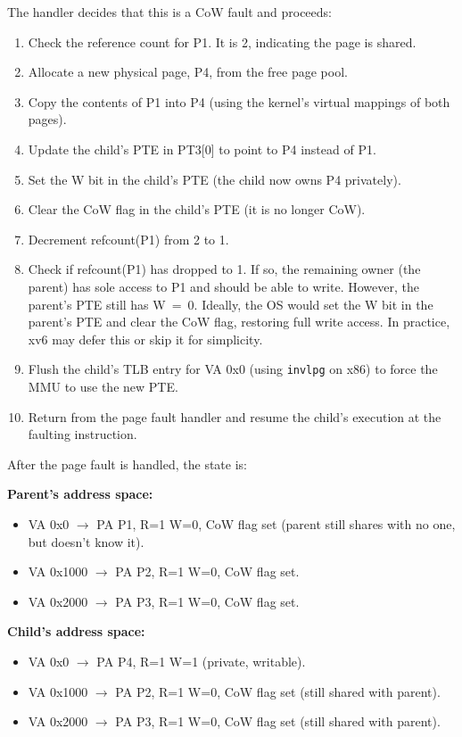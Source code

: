 \documentclass[11pt]{article}
\begin{document}
The handler decides that this is a CoW fault and proceeds:

\begin{enumerate}
    \item Check the reference count for P1. It is 2, indicating the page is shared.
    \item Allocate a new physical page, P4, from the free page pool.
    \item Copy the contents of P1 into P4 (using the kernel's virtual mappings of both pages).
    \item Update the child's PTE in PT3[0] to point to P4 instead of P1.
    \item Set the W bit in the child's PTE (the child now owns P4 privately).
    \item Clear the CoW flag in the child's PTE (it is no longer CoW).
    \item Decrement refcount(P1) from 2 to 1.
    \item Check if refcount(P1) has dropped to 1. If so, the remaining owner (the parent) has sole access to P1 and should be able to write. However, the parent's PTE still has W~=~0. Ideally, the OS would set the W bit in the parent's PTE and clear the CoW flag, restoring full write access. In practice, xv6 may defer this or skip it for simplicity.
    \item Flush the child's TLB entry for VA 0x0 (using \texttt{invlpg} on x86) to force the MMU to use the new PTE.
    \item Return from the page fault handler and resume the child's execution at the faulting instruction.
\end{enumerate}

After the page fault is handled, the state is:

\textbf{Parent's address space:}
\begin{itemize}
    \item VA 0x0 $\rightarrow$ PA P1, R=1 W=0, CoW flag set (parent still shares with no one, but doesn't know it).
    \item VA 0x1000 $\rightarrow$ PA P2, R=1 W=0, CoW flag set.
    \item VA 0x2000 $\rightarrow$ PA P3, R=1 W=0, CoW flag set.
\end{itemize}

\textbf{Child's address space:}
\begin{itemize}
    \item VA 0x0 $\rightarrow$ PA P4, R=1 W=1 (private, writable).
    \item VA 0x1000 $\rightarrow$ PA P2, R=1 W=0, CoW flag set (still shared with parent).
    \item VA 0x2000 $\rightarrow$ PA P3, R=1 W=0, CoW flag set (still shared with parent).
\end{itemize}
\end{document}
